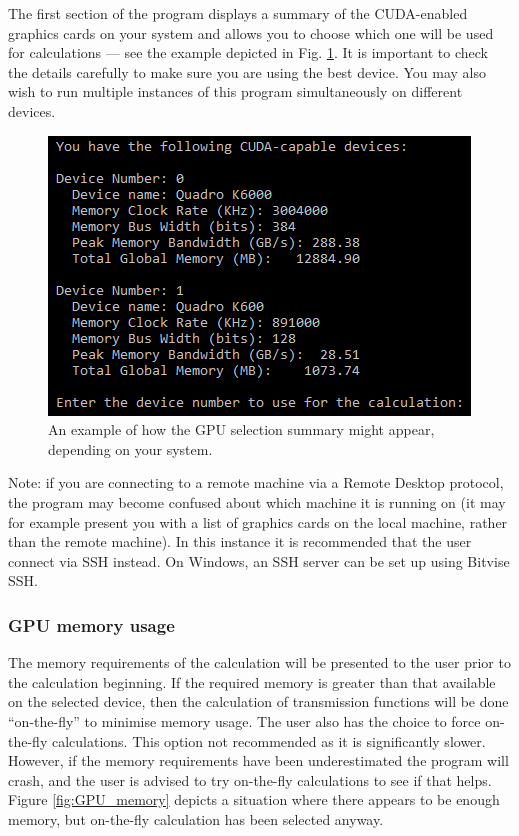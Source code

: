 \documentclass[12pt,a4paper]{article}
\begin{document}
The first section of the program displays a summary of the CUDA-enabled graphics cards on your system and allows you to choose which one will be used for calculations --- see the example depicted in Fig. \ref{fig:GPU}.
It is important to check the details carefully to make sure you are using the best device.
You may also wish to run multiple instances of this program simultaneously on different devices.

\begin{figure}[!h]
\begin{center}
\includegraphics[scale=0.75]{GPU.png}
\caption{An example of how the GPU selection summary might appear, depending on your system.}
\label{fig:GPU}
\end{center}
\end{figure}

Note: if you are connecting to a remote machine via a Remote Desktop protocol, the program may become confused about which machine it is running on (it may for example present you with a list of graphics cards on the local machine, rather than the remote machine).
In this instance it is recommended that the user connect via SSH instead.
On Windows, an SSH server can be set up using Bitvise SSH.

\subsubsection{GPU memory usage}

The memory requirements of the calculation will be presented to the user prior to the calculation beginning.
If the required memory is greater than that available on the selected device, then the calculation of transmission functions will be done ``on-the-fly'' to minimise memory usage.
The user also has the choice to force on-the-fly calculations.
This option not recommended as it is significantly slower.
However, if the memory requirements have been underestimated the program will crash, and the user is advised to try on-the-fly calculations to see if that helps.
Figure \ref{fig:GPU_memory} depicts a situation where there appears to be enough memory, but on-the-fly calculation has been selected anyway.
\end{document}
